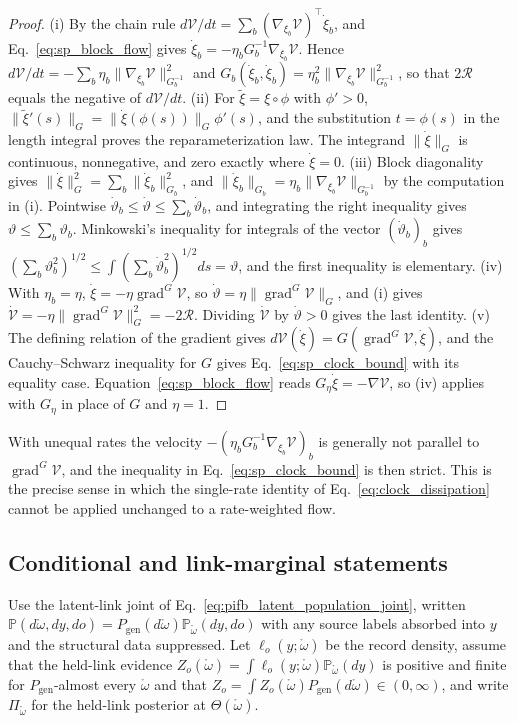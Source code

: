 \begin{proof}
(i) By the chain rule $d\mathcal V/dt=\sum_b(\nabla_{\xi_b}\mathcal V)^\top\dot\xi_b$, and Eq.~\eqref{eq:sp_block_flow} gives $\dot\xi_b=-\eta_bG_b^{-1}\nabla_{\xi_b}\mathcal V$. Hence $d\mathcal V/dt=-\sum_b\eta_b\|\nabla_{\xi_b}\mathcal V\|_{G_b^{-1}}^2$ and $G_b(\dot\xi_b,\dot\xi_b)=\eta_b^2\|\nabla_{\xi_b}\mathcal V\|_{G_b^{-1}}^2$, so that $2\mathcal R$ equals the negative of $d\mathcal V/dt$.
(ii) For $\tilde\xi=\xi\circ\phi$ with $\phi'>0$, $\|\tilde\xi'(s)\|_G=\|\dot\xi(\phi(s))\|_G\phi'(s)$, and the substitution $t=\phi(s)$ in the length integral proves the reparameterization law. The integrand $\|\dot\xi\|_G$ is continuous, nonnegative, and zero exactly where $\dot\xi=0$.
(iii) Block diagonality gives $\|\dot\xi\|_G^2=\sum_b\|\dot\xi_b\|_{G_b}^2$, and $\|\dot\xi_b\|_{G_b}=\eta_b\|\nabla_{\xi_b}\mathcal V\|_{G_b^{-1}}$ by the computation in (i). Pointwise $\dot\vartheta_b\leq\dot\vartheta\leq\sum_b\dot\vartheta_b$, and integrating the right inequality gives $\vartheta\leq\sum_b\vartheta_b$. Minkowski's inequality for integrals of the vector $(\dot\vartheta_b)_b$ gives $(\sum_b\vartheta_b^2)^{1/2}\leq\int(\sum_b\dot\vartheta_b^2)^{1/2}ds=\vartheta$, and the first inequality is elementary.
(iv) With $\eta_b=\eta$, $\dot\xi=-\eta\operatorname{grad}^G\mathcal V$, so $\dot\vartheta=\eta\|\operatorname{grad}^G\mathcal V\|_G$, and (i) gives $\dot{\mathcal V}=-\eta\|\operatorname{grad}^G\mathcal V\|_G^2=-2\mathcal R$. Dividing $\dot{\mathcal V}$ by $\dot\vartheta>0$ gives the last identity.
(v) The defining relation of the gradient gives $d\mathcal V(\dot\xi)=G(\operatorname{grad}^G\mathcal V,\dot\xi)$, and the Cauchy--Schwarz inequality for $G$ gives Eq.~\eqref{eq:sp_clock_bound} with its equality case. Equation~\eqref{eq:sp_block_flow} reads $G_\eta\dot\xi=-\nabla\mathcal V$, so (iv) applies with $G_\eta$ in place of $G$ and $\eta=1$.
\end{proof}
With unequal rates the velocity $-(\eta_bG_b^{-1}\nabla_{\xi_b}\mathcal V)_b$ is generally not parallel to $\operatorname{grad}^G\mathcal V$, and the inequality in Eq.~\eqref{eq:sp_clock_bound} is then strict. This is the precise sense in which the single-rate identity of Eq.~\eqref{eq:clock_dissipation} cannot be applied unchanged to a rate-weighted flow.

\subsection{Conditional and link-marginal statements}\label{app:sp_link_transfer}
Use the latent-link joint of Eq.~\eqref{eq:pifb_latent_population_joint}, written $\mathbb P(d\mathring\omega,dy,do)=P_{\mathrm{gen}}(d\mathring\omega)\mathbb P_{\mathring\omega}(dy,do)$ with any source labels absorbed into $y$ and the structural data suppressed. Let $\ell_o(y;\mathring\omega)$ be the record density, assume that the held-link evidence $Z_o(\mathring\omega)=\int\ell_o(y;\mathring\omega)\mathbb P_{\mathring\omega}(dy)$ is positive and finite for $P_{\mathrm{gen}}$-almost every $\mathring\omega$ and that $Z_o=\int Z_o(\mathring\omega)P_{\mathrm{gen}}(d\mathring\omega)\in(0,\infty)$, and write $\Pi_{\mathring\omega}$ for the held-link posterior at $\Theta(\mathring\omega)$.

